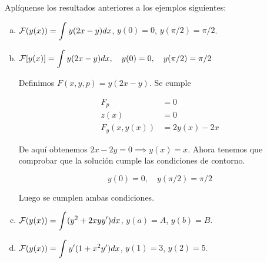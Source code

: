 \begin{ejercicio}
Aplíquense los resultados anteriores a los ejemplos siguientes:
\begin{enumerate}[a)]
\item $\mathcal{F}(y(x))=\displaystyle\int_{  }^{  } y(2x-y)dx$, $y(0)=0$, $y(\pi/2)=\pi/2$.
\item $\mathcal{F}[y(x)] =\displaystyle\int_{  }^{  } y(2x-y)dx, \quad y(0) = 0, \quad y(\pi/2) = \pi/2$

    Definimos $F(x,y,p) = y(2x-y)$. Se cumple

    \begin{align*}
      F_p &= 0\\
      z(x) &= 0\\
      F_y(x,y(x)) &= 2y(x)-2x
    \end{align*}

    De aquí obtenemos $2x-2y = 0 \implies y(x) = x$. Ahora tenemos que
    comprobar que la solución cumple las condiciones de contorno.

    \[
      y(0) = 0, \quad y(\pi/2) = \pi/2
    \]
    
    Luego se cumplen ambas condiciones.
\item $\mathcal{F}(y(x))=\displaystyle\int_{  }^{  } (y^2+2xyy')dx$, $y(a)=A$, $y(b)=B$.
\item $\mathcal{F}(y(x))=\displaystyle\int_{  }^{  } y'(1+x^2y')dx$, $y(1)=3$, $y(2)=5$.
\end{enumerate}
\end{ejercicio}

